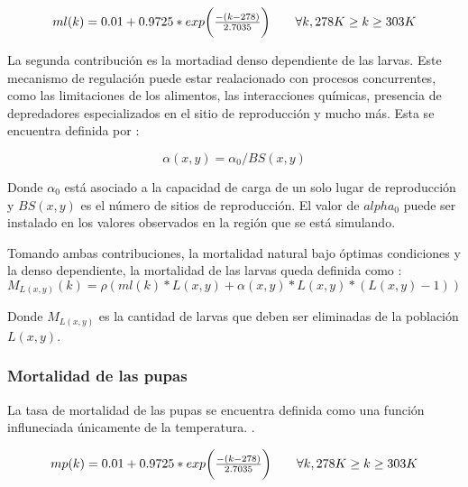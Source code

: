 \begin{equation}
 \begin{array}{l l}
    ml(k) = 0.01 + 0.9725 * exp\bigg( \frac{-(k - 278)}{2.7035}\bigg) &\quad  \forall k, 278 K \geq k \geq 303 K\\
\end{array}
\end{equation}

La segunda contribución es la mortadiad denso dependiente de las larvas. Este mecanismo de
regulación puede estar realacionado con procesos concurrentes, como las limitaciones de los
alimentos, las interacciones químicas, presencia de depredadores especializados en el sitio de
reproducción y mucho más\citep{otero2006stochastic}. Esta se encuentra definida por :

\begin{equation}
  \alpha (x,y) = \alpha _{0}/BS(x,y)
\end{equation}

Donde $\alpha _{0}$ está asociado a la capacidad de carga de un solo lugar de reproducción y
$BS(x,y)$ es el número de sitios de reproducción. El valor de $alpha _{0}$ puede ser instalado en
los valores observados en la región que se está simulando.

Tomando ambas contribuciones, la mortalidad natural bajo óptimas condiciones y la denso
dependiente, la mortalidad de las larvas queda definida como :
\begin{equation}
    M_{L(x,y)}(k) = \rho(ml(k) * L(x,y) + \alpha (x,y) * L(x,y) *(L(x,y) - 1))
\end{equation}

Donde $M_{L(x,y)}$ es la cantidad de larvas que deben ser eliminadas de la población $L(x,y)$.

\subsubsection{Mortalidad de las pupas}
La tasa de mortalidad de las pupas se encuentra definida como una función influneciada únicamente
de la temperatura. \citep{otero2006stochastic}.

\begin{equation}
 \begin{array}{l l}
    mp(k) = 0.01 + 0.9725 * exp\bigg( \frac{-(k - 278)}{2.7035}\bigg) &\quad  \forall k, 278 K \geq k \geq 303 K\\
\end{array}
\end{equation}

